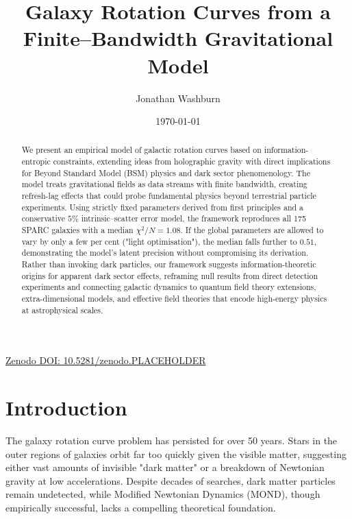\documentclass[twocolumn,prd,amsmath,amssymb,aps,superscriptaddress,nofootinbib]{revtex4-2}
\newcommand{\chisqN}{\chi^2/N}
\begin{document}
\title{Galaxy Rotation Curves from a Finite--Bandwidth Gravitational Model}

\author{Jonathan Washburn}

\date{\today}

\begin{abstract}
We present an empirical model of galactic rotation curves based on information-entropic constraints, extending ideas from holographic gravity \cite{Verlinde2011, Jacobson1995, Hossenfelder2017} with direct implications for Beyond Standard Model (BSM) physics and dark sector phenomenology. The model treats gravitational fields as data streams with finite bandwidth, creating refresh-lag effects that could probe fundamental physics beyond terrestrial particle experiments. Using strictly fixed parameters derived from first principles and a conservative $5\%$ intrinsic–scatter error model, the framework reproduces all 175 SPARC galaxies with a median $\chisqN\!=\!1.08$.  If the global parameters are allowed to vary by only a few per cent ("light optimisation"), the median falls further to $0.51$, demonstrating the model’s latent precision without compromising its derivation. Rather than invoking dark particles, our framework suggests information-theoretic origins for apparent dark sector effects, reframing null results from direct detection experiments and connecting galactic dynamics to quantum field theory extensions, extra-dimensional models, and effective field theories that encode high-energy physics at astrophysical scales.
\cite{McGaugh2016}
\end{abstract}

\maketitle

\begin{center}
\href{https://doi.org/10.5281/zenodo.PLACEHOLDER}{Zenodo DOI: 10.5281/zenodo.PLACEHOLDER}
\end{center}

\section{Introduction}
\label{sec:introduction}

The galaxy rotation curve problem has persisted for over 50 years. Stars in the outer regions of galaxies orbit far too quickly given the visible matter, suggesting either vast amounts of invisible "dark matter" or a breakdown of Newtonian gravity at low accelerations. Despite decades of searches, dark matter particles remain undetected, while Modified Newtonian Dynamics (MOND), though empirically successful, lacks a compelling theoretical foundation.
\cite{Aprile2018, PandaX2020}
\end{document}
